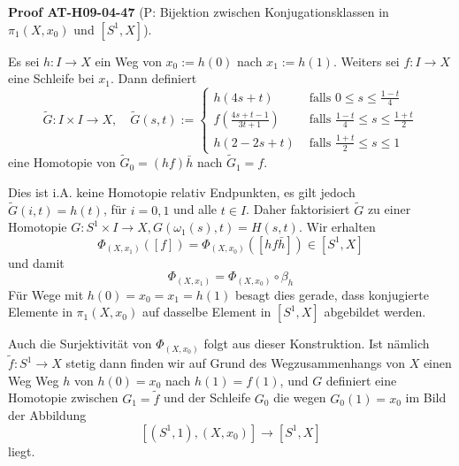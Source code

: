 \documentclass[10pt, letterpaper]{article}
\newcommand{\CustomHeading}[3]{%
  \par\medskip\noindent%
  \textbf{#1 #2} \textnormal{(#3)}.\enskip%
}
\newenvironment{PROOF}[2]{\CustomHeading{Proof}{#1}{#2}}{}
\begin{document}
\begin{PROOF}{AT-H09-04-47}{P: Bijektion zwischen Konjugationsklassen in $\pi_1\left(X, x_0\right)$ und $\left[S^1, X\right]$}
Es sei $h: I \rightarrow X$ ein Weg von $x_0:=h(0)$ nach $x_1:=h(1)$. Weiters sei $f: I \rightarrow X$ eine Schleife bei $x_1$. Dann definiert
$$
\tilde{G}: I \times I \rightarrow X, \quad \tilde{G}(s, t):= \begin{cases}h(4 s+t) & \text { falls } 0 \leq s \leq \frac{1-t}{4} \\ f\left(\frac{4 s+t-1}{3 t+1}\right) & \text { falls } \frac{1-t}{4} \leq s \leq \frac{1+t}{2} \\ h(2-2 s+t) & \text { falls } \frac{1+t}{2} \leq s \leq 1\end{cases}
$$
eine Homotopie von $\tilde{G}_0=(h f) \bar{h}$ nach $\tilde{G}_1=f$. 

Dies ist i.A. keine Homotopie relativ Endpunkten, es gilt jedoch $\tilde{G}(i, t)=h(t)$, für $i=0,1$ und alle $t \in I$. Daher faktorisiert $\tilde{G}$ zu einer Homotopie $G: S^1 \times I \rightarrow X, G\left(\omega_1(s), t\right)=H(s, t)$. Wir erhalten 
$$\Phi_{\left(X, x_1\right)}([f])=\Phi_{\left(X, x_0\right)}([h f \bar{h}]) \in\left[S^1, X\right]$$ 
und damit 
$$\Phi_{\left(X, x_1\right)}=\Phi_{\left(X, x_0\right)} \circ \beta_h$$ 
Für Wege mit $h(0)=x_0=x_1=h(1)$ besagt dies gerade, dass konjugierte Elemente in $\pi_1\left(X, x_0\right)$ auf dasselbe Element in $\left[S^1, X\right]$ abgebildet werden. 

Auch die Surjektivität von $\Phi_{\left(X, x_0\right)}$ folgt aus dieser Konstruktion. Ist nämlich $\tilde{f}: S^1 \rightarrow X$ stetig dann finden wir auf Grund des Wegzusammenhangs von $X$ einen Weg Weg $h$ von $h(0)=x_0$ nach $h(1)=f(1)$, und $G$ definiert eine Homotopie zwischen $G_1=\tilde{f}$ und der Schleife $G_0$ die wegen $G_0(1)=x_0$ im Bild der Abbildung 
$$\left[\left(S^1, 1\right),\left(X, x_0\right)\right] \rightarrow\left[S^1, X\right]$$ 
liegt. 


\end{PROOF}
\end{document}
